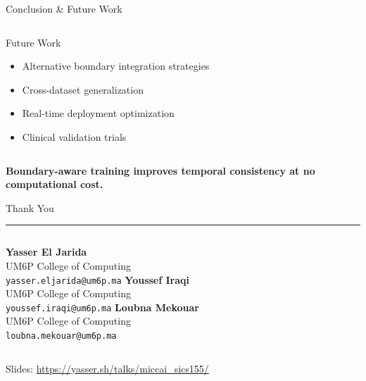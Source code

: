 \documentclass[9pt,aspectratio=169]{beamer}
\newcommand{\separator}{\vspace{0.3em}\textcolor{primaryOrange}{\rule{\linewidth}{0.5pt}}\vspace{0.3em}}
\begin{document}
\begin{frame}[label=slide10]{Conclusion \& Future Work}
\begin{columns}[T,onlytextwidth]
      \begin{block}{Future Work}
        \begin{itemize}
          \item Alternative boundary integration strategies
          \item Cross-dataset generalization
          \item Real-time deployment optimization
          \item Clinical validation trials
        \end{itemize}
      \end{block}
  \end{columns}
  
  \vspace{0.5em}
  \begin{center}
    \begin{minipage}{0.8\textwidth}
      \centering
      \scriptsize
      \textbf{Boundary-aware training improves temporal consistency at no computational cost.}
    \end{minipage}
  \end{center}
\end{frame}

\begin{frame}[standout]
  \begin{center}
    {\Huge Thank You}
    \vspace{1cm}
    
    \separator
    
    \vspace{0.5cm}
    
    \begin{columns}[T,onlytextwidth]
        \centering
        {\normalsize\textbf{Yasser El Jarida}\\
        UM6P College of Computing\\
        \texttt{yasser.eljarida@um6p.ma}}
        \centering
        {\normalsize\textbf{Youssef Iraqi}\\
        UM6P College of Computing\\
        \texttt{youssef.iraqi@um6p.ma}}
        \centering
        {\normalsize\textbf{Loubna Mekouar}\\
        UM6P College of Computing\\
        \texttt{loubna.mekouar@um6p.ma}}
    \end{columns}
    \vspace{2em}
    {\large Slides: \url{https://yasser.sh/talks/miccai_sics155/}}
  \end{center}
\end{frame}
\end{document}
